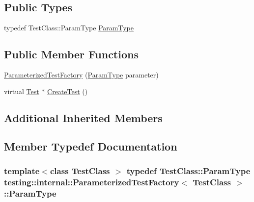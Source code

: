 \subsection*{Public Types}
\begin{DoxyCompactItemize}
\item 
typedef Test\-Class\-::\-Param\-Type \hyperlink{classtesting_1_1internal_1_1ParameterizedTestFactory_ad9a27b8e1a83de2f1687625bccff460d}{Param\-Type}
\end{DoxyCompactItemize}
\subsection*{Public Member Functions}
\begin{DoxyCompactItemize}
\item 
\hyperlink{classtesting_1_1internal_1_1ParameterizedTestFactory_a82d78356cd402224255edec760a048fb}{Parameterized\-Test\-Factory} (\hyperlink{classtesting_1_1internal_1_1ParameterizedTestFactory_ad9a27b8e1a83de2f1687625bccff460d}{Param\-Type} parameter)
\item 
virtual \hyperlink{classtesting_1_1Test}{Test} $\ast$ \hyperlink{classtesting_1_1internal_1_1ParameterizedTestFactory_ae17e73e91f7fd5d49ca238c005ef4960}{Create\-Test} ()
\end{DoxyCompactItemize}
\subsection*{Additional Inherited Members}


\subsection{Member Typedef Documentation}
\hypertarget{classtesting_1_1internal_1_1ParameterizedTestFactory_ad9a27b8e1a83de2f1687625bccff460d}{
\subsubsection[{Param\-Type}]{\setlength{\rightskip}{0pt plus 5cm}template$<$class Test\-Class $>$ typedef Test\-Class\-::\-Param\-Type {\bf testing\-::internal\-::\-Parameterized\-Test\-Factory}$<$ Test\-Class $>$\-::{\bf Param\-Type}}}\label{classtesting_1_1internal_1_1ParameterizedTestFactory_ad9a27b8e1a83de2f1687625bccff460d}


